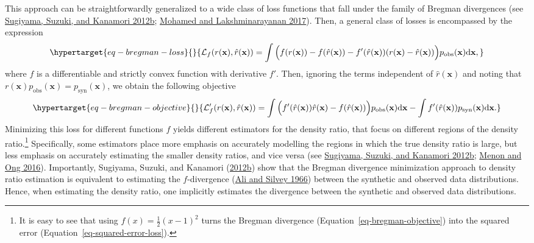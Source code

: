 \documentclass[
]{article}
\newcommand{\pobs}{p_{\text{obs}}}
\newcommand{\psyn}{p_{\text{syn}}}
\newcommand{\bx}{\mathbf{x}}
\begin{document}
This approach can be straightforwardly generalized to a wide class of
loss functions that fall under the family of Bregman divergences (see
\protect\hyperlink{ref-sugiyama_bregman_2012}{Sugiyama, Suzuki, and
Kanamori 2012b}; \protect\hyperlink{ref-mohamed2017learning}{Mohamed and
Lakshminarayanan 2017}). Then, a general class of losses is encompassed
by the expression
\begin{equation}\protect\hypertarget{eq-bregman-loss}{}{
\mathcal{L}_f (r(\bx), \hat{r}(\bx)) =
\int \Big(
f(r(\bx)) - f(\hat{r}(\bx)) - f'(\hat{r}(\bx))(r(\bx) - \hat{r}(\bx))
\Big) \pobs(\bx) \text{d}\bx,
}\label{eq-bregman-loss}\end{equation} where \(f\) is a differentiable
and strictly convex function with derivative \(f'\). Then, ignoring the
terms independent of \(\hat{r}(\bx)\) and noting that
\(r(\bx)\pobs(\bx) = \psyn(\bx)\), we obtain the following objective
\begin{equation}\protect\hypertarget{eq-bregman-objective}{}{
\mathcal{L}'_f (r(\bx), \hat{r}(\bx)) = \int 
\Big( 
f'(\hat{r}(\bx)) \hat{r}(\bx) - f(\hat{r}(\bx))
\Big)  \pobs(\bx) \text{d}\bx
- \int f'(\hat{r}(\bx)) \psyn(\bx)
\text{d}\bx.
}\label{eq-bregman-objective}\end{equation} Minimizing this loss for
different functions \(f\) yields different estimators for the density
ratio, that focus on different regions of the density ratio.\footnote{It
  is easy to see that using \(f(x) = \frac{1}{2}(x-1)^2\) turns the
  Bregman divergence (Equation~\ref{eq-bregman-objective}) into the
  squared error (Equation~\ref{eq-squared-error-loss}).} Specifically,
some estimators place more emphasis on accurately modelling the regions
in which the true density ratio is large, but less emphasis on
accurately estimating the smaller density ratios, and vice versa (see
\protect\hyperlink{ref-sugiyama_bregman_2012}{Sugiyama, Suzuki, and
Kanamori 2012b}; \protect\hyperlink{ref-menon2016dreloss}{Menon and Ong
2016}). Importantly, Sugiyama, Suzuki, and Kanamori
(\protect\hyperlink{ref-sugiyama_bregman_2012}{2012b}) show that the
Bregman divergence minimization approach to density ratio estimation is
equivalent to estimating the \(f\)-divergence
(\protect\hyperlink{ref-ali_silvey_divergence_1966}{Ali and Silvey
1966}) between the synthetic and observed data distributions. Hence,
when estimating the density ratio, one implicitly estimates the
divergence between the synthetic and observed data distributions.
\end{document}
